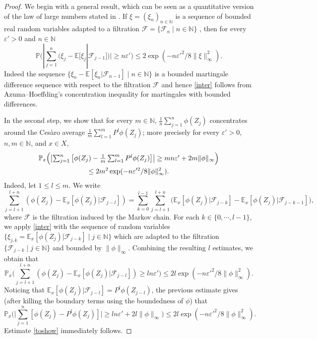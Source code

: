 \documentclass[JEP,XML,SOM,Unicode,published]{cedram}
\let\epsilon\varepsilon
\let\sep\mid
\let\ts\textstyle
\theoremstyle{plain}
\theoremstyle{definition}
\newcommand\E{\mathbb{E}}
\newcommand\p{\mathbb{P}}
\newcommand\N{\mathbb{N}}
\begin{document}
\begin{proof}
We begin with a general result, which can be seen as a quantitative version of the law of large numbers stated in \cite[Th.\,1.6]{BQ.book}. If $\xi=(\xi_n)_{n\in \N}$ is a sequence of bounded real random variables adapted to a filtration $\mathcal{F}=\{\mathcal{F}_n \sep n\in \N\}$ , then for every $\epsilon'>0$ and $n\in \N$
\begin{equation}\label{inter}
\p \bigl(|\ts\sum_{j=1}^n(\xi_j - \E[\xi_j| \mathcal{F}_{j-1}])| \geq n\epsilon'\bigr)\leq 2 \exp(-n\epsilon'^2/8\|\xi\|_{\infty}^2).\end{equation}
Indeed the sequence $\{\xi_n-\E[\xi_n| \mathcal{F}_{n-1}] \sep n\in \N\}$ is a bounded martingale difference sequence with respect to the filtration $\mathcal{F}$ and hence \eqref{inter} follows from Azuma--Hoeffding's concentration inequality for martingales with bounded differences.

In the second step, we show that for every $m\in \N$, $\frac{1}{n}\sum_{j=1}^n{\phi(Z_j)}$ concentrates around the Cesàro average $\frac{1}{m}\sum_{l=1}^m{P^l \phi(Z_j)}$; more precisely for every $\epsilon'>0$, $n,m\in \N$, and $x \in X$,\vspace*{-3pt}
\begin{multline}\label{toshow}
\p_x\Bigl(\bigl|\ts\sum_{j=1}^{n}
{\bigl[\phi(Z_{j})-\frac{1}{m}\sum_{l=1}^mP^l\phi(Z_{j})}\bigr]\bigr| \geq m n \epsilon'+2m\|\phi\|_{\infty}\Bigr)\\
\leq 2 m^2
\exp(-n\epsilon'^2/8\|\phi\|_{\infty}^2).
\end{multline}
Indeed, let $1\leq l \leq m$. We write\vspace*{-3pt}
\[
\sum_{j=l+1}^{l+n}
{(\phi(Z_{j})-\E_x[\phi(Z_j) | \mathcal{F}_{j-l}])}=
\sum_{k=0}^{l-1} \sum_{j=l+1}^{l+n}{
(\E_x[\phi(Z_j)| \mathcal{F}_{j-k}]-
\E_x[\phi(Z_j)|
\mathcal{F}_{j-k-1}]}),
\]
where $\mathcal{F}$ is the filtration induced by the Markov chain.
For each $k\in \{0,\cdots, l-1\}$, we apply \eqref{inter} with
the sequence
of random variables
$\{\xi_{j,k}=\E_x[\phi(Z_j)| \mathcal{F}_{j-k}] \sep j\in \N\}$ which are adapted to the filtration
$\{\mathcal{F}_{j-k}\sep j\in \N\}$ and bounded by $\|\phi\|_{\infty}$. Combining the resulting $l$ estimates, we obtain that
\[
\p_x\bigl(\ts\sum_{j=l+1}^{l+n}
(\phi(Z_{j})-\E_x[\phi(Z_j)|\mathcal{F}_{j-l}]) \geq l n \epsilon'\bigr)\leq 2 l
\exp(-n\epsilon'^2/8\|\phi\|_{\infty}^2).
\]
Noticing that $\E_x[\phi(Z_j)|\mathcal{F}_{j-l}]=P^l\phi(Z_{j-l})$, the previous estimate gives (after killing the boundary terms using the boundedness of $\phi$) that
\[
\p_x\bigl(\bigl|\ts\sum_{j=1}^{n}
{[\phi(Z_{j})-P^l\phi(Z_{j})]}\bigr| \geq l n \epsilon'+2l\|\phi\|_{\infty}\bigr)\leq 2l
\exp(-n\epsilon'^2/8\|\phi\|_{\infty}^2).
\]
Estimate \eqref{toshow} immediately follows.


\end{proof}
\end{document}
